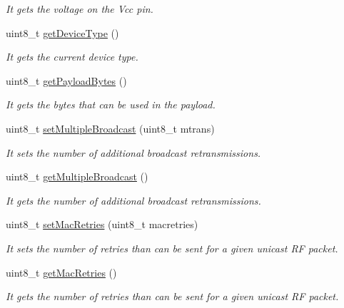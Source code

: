 \begin{DoxyCompactItemize}
\begin{DoxyCompactList}\small\item\em It gets the voltage on the Vcc pin. \end{DoxyCompactList}\item 
uint8\+\_\+t \hyperlink{class_wasp_x_bee868_a971e72cc8111ce6ea65a32fe92d02ba6}{get\+Device\+Type} ()
\begin{DoxyCompactList}\small\item\em It gets the current device type. \end{DoxyCompactList}\item 
uint8\+\_\+t \hyperlink{class_wasp_x_bee868_ae047ae90872c78b4bb2944b754884204}{get\+Payload\+Bytes} ()
\begin{DoxyCompactList}\small\item\em It gets the bytes that can be used in the payload. \end{DoxyCompactList}\item 
uint8\+\_\+t \hyperlink{class_wasp_x_bee868_a69bc95421b99220c2c637693bb2fada7}{set\+Multiple\+Broadcast} (uint8\+\_\+t mtrans)
\begin{DoxyCompactList}\small\item\em It sets the number of additional broadcast retransmissions. \end{DoxyCompactList}\item 
uint8\+\_\+t \hyperlink{class_wasp_x_bee868_aa3f089c95f40ea7e78a2574705f242f7}{get\+Multiple\+Broadcast} ()
\begin{DoxyCompactList}\small\item\em It gets the number of additional broadcast retransmissions. \end{DoxyCompactList}\item 
uint8\+\_\+t \hyperlink{class_wasp_x_bee868_ab9aa3a7b66d8409985918bbc63fdc0a3}{set\+Mac\+Retries} (uint8\+\_\+t macretries)
\begin{DoxyCompactList}\small\item\em It sets the number of retries than can be sent for a given unicast RF packet. \end{DoxyCompactList}\item 
uint8\+\_\+t \hyperlink{class_wasp_x_bee868_a740cb7a978d5478582a08c8facc648b6}{get\+Mac\+Retries} ()
\begin{DoxyCompactList}\small\item\em It gets the number of retries than can be sent for a given unicast RF packet. \end{DoxyCompactList}\item 

\end{DoxyCompactItemize}
